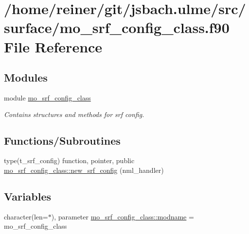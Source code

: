 \hypertarget{mo__srf__config__class_8f90}{}\section{/home/reiner/git/jsbach.ulme/src/surface/mo\+\_\+srf\+\_\+config\+\_\+class.f90 File Reference}
\label{mo__srf__config__class_8f90}
\subsection*{Modules}
\begin{DoxyCompactItemize}
\item 
module \hyperlink{namespacemo__srf__config__class}{mo\+\_\+srf\+\_\+config\+\_\+class}
\begin{DoxyCompactList}\small\item\em Contains structures and methods for srf config. \end{DoxyCompactList}\end{DoxyCompactItemize}
\subsection*{Functions/\+Subroutines}
\begin{DoxyCompactItemize}
\item 
type(t\+\_\+srf\+\_\+config) function, pointer, public \hyperlink{namespacemo__srf__config__class_ab74df301c0b4a0a8c1b10dfd0fdee25c}{mo\+\_\+srf\+\_\+config\+\_\+class\+::new\+\_\+srf\+\_\+config} (nml\+\_\+handler)
\end{DoxyCompactItemize}
\subsection*{Variables}
\begin{DoxyCompactItemize}
\item 
character(len=$\ast$), parameter \hyperlink{namespacemo__srf__config__class_af7402e483a2efefdc0024b5e431a70e1}{mo\+\_\+srf\+\_\+config\+\_\+class\+::modname} = \textquotesingle{}mo\+\_\+srf\+\_\+config\+\_\+class\textquotesingle{}
\end{DoxyCompactItemize}
